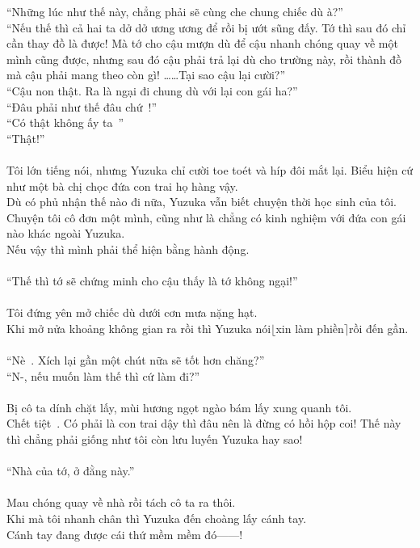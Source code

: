 \documentclass[12pt,a4paper, twosides]{book}
\begin{document}
“Những lúc như thế này, chẳng phải sẽ cùng che chung chiếc dù à?”\\
“Nếu thế thì cả hai ta dở dở ương ương để rồi bị ướt sũng đấy. Tớ thì sau đó chỉ cần thay đồ là được! Mà tớ cho cậu mượn dù để cậu nhanh chóng quay về một mình cũng được, nhưng sau đó cậu phải trả lại dù cho trường này, rồi thành đồ mà cậu phải mang theo còn gì! ……Tại sao cậu lại cười?”\\
“Cậu non thật. Ra là ngại đi chung dù với lại con gái ha?”\\
“Đâu phải như thế đâu chứ~!”\\
“Có thật không ấy ta~”\\
“Thật!”\\
\\
Tôi lớn tiếng nói, nhưng Yuzuka chỉ cười toe toét và híp đôi mắt lại. Biểu hiện cứ như một bà chị chọc đứa con trai họ hàng vậy.\\
Dù có phủ nhận thế nào đi nữa, Yuzuka vẫn biết chuyện thời học sinh của tôi. Chuyện tôi cô đơn một mình, cũng như là chẳng có kinh nghiệm với đứa con gái nào khác ngoài Yuzuka.\\
Nếu vậy thì mình phải thể hiện bằng hành động.\\
\\
“Thế thì tớ sẽ chứng minh cho cậu thấy là tớ không ngại!”\\
\\
Tôi đứng yên mở chiếc dù dưới cơn mưa nặng hạt.\\
Khi mở nửa khoảng không gian ra rồi thì Yuzuka nói$\lfloor$xin làm phiền$\rceil$rồi đến gần.\\
\\
“Nè~. Xích lại gần một chút nữa sẽ tốt hơn chăng?”\\
“N-, nếu muốn làm thế thì cứ làm đi?”\\
\\
Bị cô ta dính chặt lấy, mùi hương ngọt ngào bám lấy xung quanh tôi.\\
Chết tiệt~. Có phải là con trai dậy thì đâu nên là đừng có hồi hộp coi! Thế này thì chẳng phải giống như tôi còn lưu luyến Yuzuka hay sao!\\
\\
“Nhà của tớ, ở đằng này.”\\
\\
Mau chóng quay về nhà rồi tách cô ta ra thôi.\\
Khi mà tôi nhanh chân thì Yuzuka đến choàng lấy cánh tay.\\
Cánh tay đang được cái thứ mềm mềm đó——!\\
\end{document}
